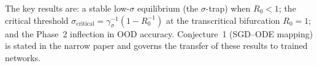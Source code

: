 \documentclass[11pt]{article}
\theoremstyle{definition}
\theoremstyle{plain}
\begin{document}
The key results are: a stable low-$\sigma$ equilibrium (the
$\sigma$-trap) when $R_0 < 1$; the critical threshold
$\sigma_{\text{critical}} = \gamma_\sigma^{-1}(1 - R_0^{-1})$ at the
transcritical bifurcation $R_0 = 1$; and the Phase~2 inflection in OOD
accuracy. Conjecture~1 (SGD--ODE mapping) is stated in the narrow paper
and governs the transfer of these results to trained networks.



\end{document}
